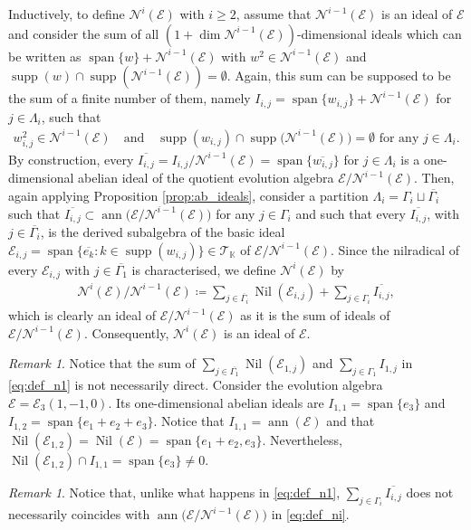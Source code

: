 \documentclass[12pt,reqno]{amsart}
\theoremstyle{definition}
\theoremstyle{remark}
\newtheorem{remark}[theorem]{Remark}
\DeclareMathOperator{\ann}{ann}
\DeclareMathOperator{\spa}{span}
\DeclareMathOperator{\supp}{supp}
\DeclareMathOperator{\nil}{Nil}
\numberwithin{equation}{section}
\begin{document}
Inductively, to define $\mathcal{N}^{i}(\mathcal{E})$ with $i\geq2$, assume that $\mathcal{N}^{i-1}(\mathcal{E})$ is an ideal of $\mathcal{E}$ and consider the sum of all $(1+\dim{\mathcal{N}^{i-1}(\mathcal{E})})$-dimensional ideals which can be written as $\spa\{w\}+\mathcal{N}^{i-1}(\mathcal{E})$ with
$w^2\in\mathcal{N}^{i-1}(\mathcal{E})$ and $\supp(w)\cap\supp(\mathcal{N}^{i-1}(\mathcal{E}))=\emptyset$. Again, this sum can be supposed to be the sum of a finite number of them, namely $I_{i,j}=\spa\{w_{i,j}\}+\mathcal{N}^{i-1}(\mathcal{E})$ for $j\in\varLambda_i$, such that
\begin{align}\label{eq:cond_soporte}
w_{i,j}^2\in\mathcal{N}^{i-1}(\mathcal{E}) \quad\text{and}\quad \supp(w_{i,j})\cap\supp\big(\mathcal{N}^{i-1}(\mathcal{E})\big)=\emptyset \text{ for any } j\in\varLambda_i.
\end{align}
By construction, every  $\overline{I_{i,j}}=I_{i,j}/\mathcal{N}^{i-1}(\mathcal{E})=\spa\{\overline{w_{i,j}}\}$ for $j\in\varLambda_i$ is a one-dimensional abelian ideal of the quotient evolution algebra $\mathcal{E}/\mathcal{N}^{i-1}(\mathcal{E})$. Then, again applying Proposition \ref{prop:ab_ideals}, consider a partition $\varLambda_i=\varGamma_i\sqcup\overline{\varGamma_i}$ such that $\overline{I_{i,j}}\subset\ann\big(\mathcal{E}/\mathcal{N}^{i-1}(\mathcal{E})\big)$ for any $j\in\varGamma_i$ and such that every $\overline{I_{i,j}}$, with $j\in\overline{\varGamma_i}$, is the derived subalgebra of the basic ideal $\mathcal{E}_{i,j}=\spa\{\overline{e_k}\colon k\in\supp(w_{i,j})\}\in\mathcal{T}_\mathbb{K}$ of $\mathcal{E}/\mathcal{N}^{i-1}(\mathcal{E})$.
Since the nilradical of every $\mathcal{E}_{i,j}$ with $j\in\overline{\varGamma_1}$ is characterised, we define $\mathcal{N}^{i}(\mathcal{E})$ by 
\begin{align}\label{eq:def_ni}
\mathcal{N}^{i}(\mathcal{E})/\mathcal{N}^{i-1}(\mathcal{E})\coloneqq\sum_{j\in\overline{\varGamma_i}}\nil(\mathcal{E}_{i,j})+\sum_{j\in\varGamma_i}\overline{I_{i,j}},
\end{align}
which is clearly an ideal of  $\mathcal{E}/\mathcal{N}^{i-1}(\mathcal{E})$ as it is the sum of ideals of $\mathcal{E}/\mathcal{N}^{i-1}(\mathcal{E})$. Consequently, $\mathcal{N}^{i}(\mathcal{E})$ is an ideal of $\mathcal{E}$.

\begin{remark}	
	Notice that the sum of $\sum_{j\in\overline{\varGamma_1}}\nil(\mathcal{E}_{1,j})$ and $\sum_{j\in\varGamma_1}I_{1,j}$ in \eqref{eq:def_n1} is not necessarily direct. Consider the evolution algebra $\mathcal{E}=\mathcal{E}_3(1,-1,0)$. Its one-dimensional abelian ideals are $I_{1,1}=\spa\{e_3\}$ and $I_{1,2}=\spa\{e_1+e_2+e_3\}$. Notice that $I_{1,1}=\ann(\mathcal{E})$ and that $\nil(\mathcal{E}_{1,2})=\nil(\mathcal{E})=\spa\{e_1+e_2,e_3\}$. Nevertheless, $\nil(\mathcal{E}_{1,2})\cap I_{1,1}=\spa\{e_3\}\neq0$.
\end{remark}
\begin{remark}
	Notice that, unlike what happens in \eqref{eq:def_n1},
	$\sum_{j\in\varGamma_i}\overline{I_{i,j}}$ does not necessarily coincides with  $\ann\big(\mathcal{E}/\mathcal{N}^{i-1}(\mathcal{E})\big)$ in \eqref{eq:def_ni}.
\end{remark}
\end{document}
